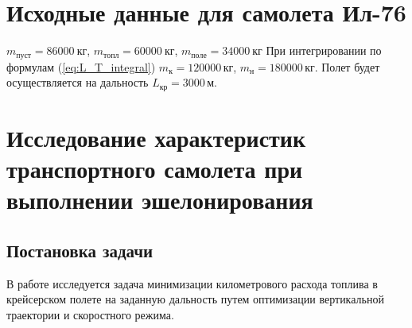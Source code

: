 \section{Исходные данные для самолета Ил-76}

$m_{пуст} = 86000\ \text{кг}$, $m_{топл}= 60000\ \text{кг}$, $m_{поле}=34000\ \text{кг}$
При интегрировании по формулам (\ref{eq:L_T_integral}) $m_{к}=120000\, кг$, $m_{н}=180000\, кг$.
Полет будет осуществляется на дальность $L_{кр} = 3000 \, м$.

\section{Исследование характеристик транспортного самолета при выполнении эшелонирования}
\subsection{Постановка задачи}
В работе исследуется задача минимизации километрового расхода топлива в крейсерском полете на заданную дальность путем оптимизации вертикальной траектории и скоростного режима.
